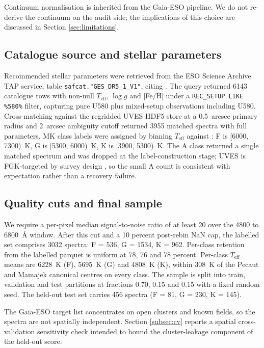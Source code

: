 \documentclass[11pt,a4paper]{article}
\newcommand{\Teff}{$T_{\mathrm{eff}}$\xspace}
\begin{document}
Continuum normalisation is inherited from the Gaia-ESO pipeline. We do not re-derive the continuum on the audit side; the implications of this choice are discussed in Section \ref{sec:limitations}.

\subsection{Catalogue source and stellar parameters}

Recommended stellar parameters were retrieved from the ESO Science Archive TAP service, table \texttt{safcat."GES\_DR5\_1\_V1"}, citing \citet{2023A&A...676A.129H}. The query returned 6143 catalogue rows with non-null \Teff, $\log g$ and [Fe/H] under a \texttt{REC\_SETUP LIKE \%580\%} filter, capturing pure U580 plus mixed-setup observations including U580. Cross-matching against the regridded UVES HDF5 store at a 0.5~arcsec primary radius and 2~arcsec ambiguity cutoff returned 3955 matched spectra with full parameters. MK class labels were assigned by binning \Teff against \citet{2013ApJS..208....9P}: F is [6000, 7300)~K, G is [5300, 6000)~K, K is [3900, 5300)~K. The A class returned a single matched spectrum and was dropped at the label-construction stage; UVES is FGK-targeted by survey design \citep{2022A&A...666A.120G}, so the small A count is consistent with expectation rather than a recovery failure.

\subsection{Quality cuts and final sample}

We require a per-pixel median signal-to-noise ratio of at least 20 over the 4800 to 6800~\AA{} window. After this cut and a 10 percent post-rebin NaN cap, the labelled set comprises 3032 spectra: F = 536, G = 1534, K = 962. Per-class retention from the labelled parquet is uniform at 78, 76 and 78 percent. Per-class \Teff means are 6228~K (F), 5695~K (G) and 4808~K (K), within 308~K of the Pecaut and Mamajek canonical centres on every class. The sample is split into train, validation and test partitions at fractions 0.70, 0.15 and 0.15 with a fixed random seed. The held-out test set carries 456 spectra (F = 81, G = 230, K = 145).

The Gaia-ESO target list concentrates on open clusters and known fields, so the spectra are not spatially independent. Section \ref{subsec:cv} reports a spatial cross-validation sensitivity check intended to bound the cluster-leakage component of the held-out score.
\end{document}
